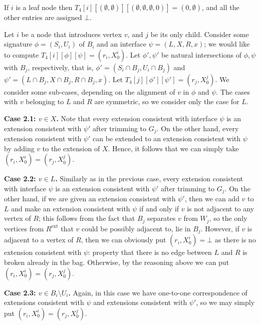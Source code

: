\documentclass[a4paper,11pt]{article}
\theoremstyle{definition}
\theoremstyle{remark}
\newcommand{\ext}{\textrm{ext}}
\begin{document}
\vskip 0.3cm
 If $i$ is a leaf node then
$T_4[i][(\emptyset,\emptyset)][(\emptyset,\emptyset,\emptyset,0)]=(0,\emptyset)$,
and all the other entries are assigned $\bot$.  \vskip 0.3cm

 Let $i$ be a node that
introduces vertex $v$, and $j$ be its only child.  Consider some
signature $\phi=(S_i,U_i)$ of $B_i$ and an interface $\psi=(L,X,R,x)$;
we would like to compute $T_4[i][\phi][\psi]=(r_i,X^i_0)$.  Let
$\phi',\psi'$ be natural intersections of $\phi,\psi$ with $B_j$,
respectively, that is, $\phi'=(S_i\cap B_j, U_i\cap B_j)$ and
$\psi'=(L\cap B_j,X\cap B_j,R\cap B_j,x)$.  Let
$T_4[j][\phi'][\psi']=(r_j,X^j_0)$.  We consider some sub-cases,
depending on the alignment of $v$ in $\phi$ and $\psi$.  The cases
with $v$ belonging to $L$ and $R$ are symmetric, so we consider only
the case for $L$.

\vskip 0.1cm {\bf{Case 2.1: $v\in X$.}} Note that every extension
consistent with interface $\psi$ is an extension consistent with
$\psi'$ after trimming to $G_j$.  On the other hand, every extension
consistent with $\psi'$ can be extended to an extension consistent
with $\psi$ by adding $v$ to the extension of $X$.  Hence, it follows
that we can simply take $(r_i,X^i_0)=(r_j,X^j_0)$.

\vskip 0.1cm {\bf{Case 2.2: $v\in L$.}} Similarly as in the previous
case, every extension consistent with interface $\psi$ is an extension
consistent with $\psi'$ after trimming to $G_j$.  On the other hand,
if we are given an extension consistent with $\psi'$, then we can add
$v$ to $L$ and make an extension consistent with $\psi$ if and only if
$v$ is not adjacent to any vertex of $R$; this follows from the fact
that $B_j$ separates $v$ from $W_j$, so the only vertices from
$R^{\ext}$ that $v$ could be possibly adjacent to, lie in $B_j$.
However, if $v$ is adjacent to a vertex of $R$, then we can obviously
put $(r_i,X^i_0)=\bot$ as there is no extension consistent with
$\psi$: property that there is no edge between $L$ and $R$ is broken
already in the bag.  Otherwise, by the reasoning above we can put
$(r_i,X^i_0)=(r_j,X^j_0)$.

\vskip 0.1cm

{\bf{Case 2.3: $v\in B_i\setminus U_i$.}} Again, in this case we have one-to-one
correspondence of extensions consistent with $\psi$ and extensions
consistent with $\psi'$, so we may simply put $(r_i,X^i_0)=(r_j,X^j_0)$.

\vskip 0.3cm
\end{document}
